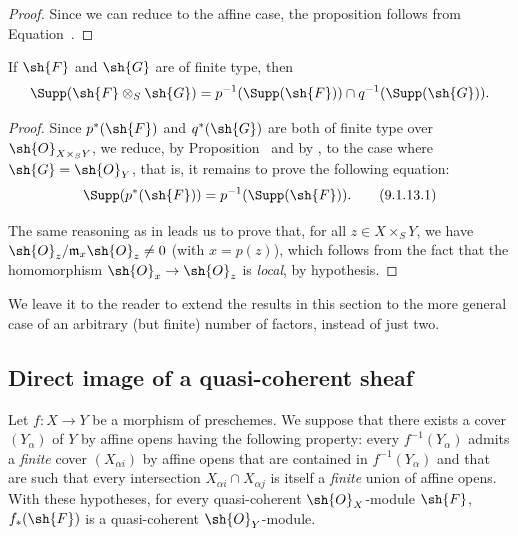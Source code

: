 \begin{proof}
Since we can reduce to the affine case, the proposition follows from
Equation~.
\end{proof}

\begin{corollary}[9.1.13]
\label{I.9.1.13}
If $\sh{F}$ and $\sh{G}$ are of finite type, then
\[
  \Supp(\sh{F}\otimes_S\sh{G})=p^{-1}(\Supp(\sh{F}))\cap q^{-1}(\Supp(\sh{G})).
\]
\end{corollary}

\begin{proof}
Since $p^*(\sh{F})$ and $q^*(\sh{G})$ are both of finite type over
$\sh{O}_{X\times_S Y}$, we reduce, by Proposition~ and
by , to the case where $\sh{G}=\sh{O}_Y$, that
is, it remains to prove the following equation:
\[
\label{I.9.1.13.1}
  \Supp(p^*(\sh{F}))=p^{-1}(\Supp(\sh{F})).
  \tag{9.1.13.1}
\]

The same reasoning as in  leads us to prove that, for all
$z\in X\times_S Y$, we have $\sh{O}_z/\mathfrak{m}_x\sh{O}_z\neq0$ (with $x=p(z)$),
which follows from the fact that the homomorphism $\sh{O}_x\to\sh{O}_z$ is \emph{local},
by hypothesis.
\end{proof}

We leave it to the reader to extend the results in this section to the more
general case of an arbitrary (but finite) number of factors, instead of just two.

\subsection{Direct image of a quasi-coherent sheaf}
\label{subsection:I.9.2}

\begin{proposition}[9.2.1]
\label{I.9.2.1}
Let $f:X\to Y$ be a morphism of
preschemes. We suppose that there exists a cover $(Y_\alpha)$ of $Y$ by affine
opens having the following property: every $f^{-1}(Y_\alpha)$ admits a
\emph{finite} cover $(X_{\alpha i})$ by affine opens that are contained in
$f^{-1}(Y_\alpha)$ and that are such that every intersection $X_{\alpha i}\cap X_{\alpha j}$
is itself a \emph{finite} union of affine opens. With these hypotheses, for
every quasi-coherent $\sh{O}_X$-module $\sh{F}$, $f_*(\sh{F})$ is a
quasi-coherent $\sh{O}_Y$-module.
\end{proposition}

